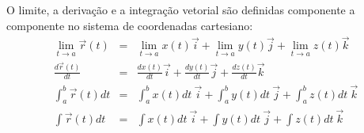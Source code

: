 O limite, a derivação e a integração vetorial são definidas componente a componente no sistema de coordenadas cartesiano:
\begin{eqnarray}
\lim_{t\to a}\vec{r}(t)&=&\lim_{t\to a}x(t) \vec{i}+\lim_{t\to a}y(t)\vec{j}+\lim_{t\to a}z(t)\vec{k}\label{deflim}\\
\frac{d\vec{r}(t)}{dt}&=&\frac{d x(t)}{dt}\vec{i}+\frac{d y(t)}{dt}\vec{j}+\frac{d z(t)}{dt}\vec{k}\label{defder}\\
\int_{a}^b\vec{r}(t){dt}&=&\int_{a}^bx(t)dt~\!\vec{i}+\int_{a}^by(t)dt~\!\vec{j}+\int_{a}^bz(t)dt~\!\vec{k}\label{defint}\\
\int\vec{r}(t){dt}&=&\int x(t)dt~\!\vec{i}+\int y(t)dt~\!\vec{j}+\int z(t)dt~\!\vec{k}\label{defint2}
\end{eqnarray}

